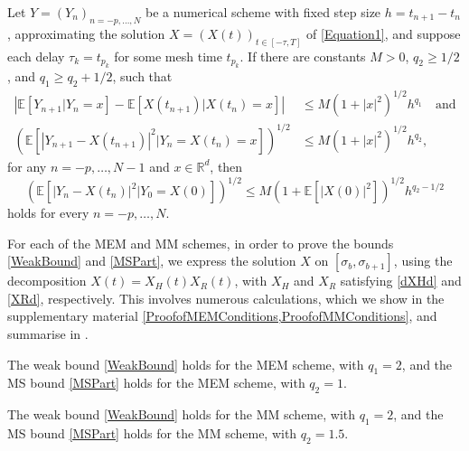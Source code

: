 \documentclass[onefignum]{siamart250211}
\providecommand{\abs}[1]{\left|#1\right|}
\begin{document}
\begin{theorem}\label{GeneralTheoremofMilsteinforSDDEs}
Let $Y=(Y_n)_{n=-p,\ldots,N}$ be a numerical scheme with fixed step size $h=t_{n+1}-t_n$, approximating the solution $X=(X(t))_{t\in[-\tau,T]}$ of
\cref{Equation1}, and suppose each delay $\tau_k=t_{p_k}$ for some mesh time $t_{p_k}$. If there are constants $M>0$, $q_2\geqslant 1/2$, and $q_1\geqslant q_2+1/2$, such that
\begin{align}
\abs{\mathbb{E}[Y_{n+1}|Y_n=x]-\mathbb{E}[X(t_{n+1})|X(t_n)=x]}&\leqslant M\left(1+\abs{x}^2\right)^{1/2}h^{q_1}\quad\textrm{and}\label{WeakBound}\\
\left(\mathbb{E}\left[\abs{Y_{n+1}-X(t_{n+1})}^2|Y_n=X(t_n)=x\right]\right)^{1/2}&\leqslant M\left(1+\abs{x}^2\right)^{1/2}h^{q_2},\label{MSPart}
\end{align}
for any $n=-p,\ldots,N-1$ and $x\in\mathbb{R}^d$, then
\begin{equation}\left(\mathbb{E}\left[\abs{Y_n-X(t_n)}^2|Y_0=X(0)\right]\right)^{1/2}\leqslant M\left(1+\mathbb{E}\left[\abs{X(0)}^2\right]\right)^{1/2}h^{q_2-1/2}\label{MSBoundSDDE}\end{equation}
holds for every $n=-p,\ldots,N$.
\end{theorem}

For each of the MEM and MM schemes, in order to prove the bounds \cref{WeakBound} and \cref{MSPart}, we express the solution $X$ on $[\sigma_b,\sigma_{b+1}]$, using the decomposition $X(t)=X_H(t)X_R(t)$, with $X_H$ and $X_R$ satisfying \cref{dXHd} and \cref{XRd}, respectively. This involves numerous calculations, which we show in the supplementary material \cref{ProofofMEMConditions,ProofofMMConditions}, and summarise in .













\begin{lemma}\label{MEMConditions}
The weak bound \cref{WeakBound} holds for the MEM scheme, with $q_1=2$, and the MS bound \cref{MSPart} holds for the MEM scheme, with $q_2=1$.
\end{lemma}

\begin{lemma}\label{MMConditions}
The weak bound \cref{WeakBound} holds for the MM scheme, with $q_1=2$, and the MS bound \cref{MSPart} holds for the MM scheme, with $q_2=1.5$.
\end{lemma}
\end{document}
